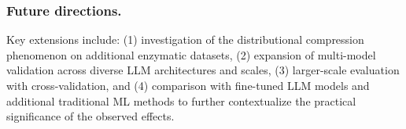 \subsubsection*{Future directions.} Key extensions include: (1) investigation of the distributional compression phenomenon on additional enzymatic datasets, (2) expansion of multi-model validation across diverse LLM architectures and scales, (3) larger-scale evaluation with cross-validation, and (4) comparison with fine-tuned LLM models and additional traditional ML methods to further contextualize the practical significance of the observed effects.
